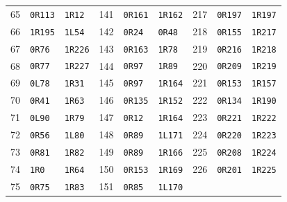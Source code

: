 \begin{longtable}{rll@{\hspace{8mm}}rll@{\hspace{8mm}}rll}
65 & \texttt{0R113} & \texttt{1R12} & 141 & \texttt{0R161} & \texttt{1R162} & 217 & \texttt{0R197} & \texttt{1R197} \\
66 & \texttt{1R195} & \texttt{1L54} & 142 & \texttt{0R24} & \texttt{0R48} & 218 & \texttt{0R155} & \texttt{1R217} \\
67 & \texttt{0R76} & \texttt{1R226} & 143 & \texttt{0R163} & \texttt{1R78} & 219 & \texttt{0R216} & \texttt{1R218} \\
68 & \texttt{0R77} & \texttt{1R227} & 144 & \texttt{0R97} & \texttt{1R89} & 220 & \texttt{0R209} & \texttt{1R219} \\
69 & \texttt{0L78} & \texttt{1R31} & 145 & \texttt{0R97} & \texttt{1R164} & 221 & \texttt{0R153} & \texttt{1R157} \\
70 & \texttt{0R41} & \texttt{1R63} & 146 & \texttt{0R135} & \texttt{1R152} & 222 & \texttt{0R134} & \texttt{1R190} \\
71 & \texttt{0L90} & \texttt{1R79} & 147 & \texttt{0R12} & \texttt{1R164} & 223 & \texttt{0R221} & \texttt{1R222} \\
72 & \texttt{0R56} & \texttt{1L80} & 148 & \texttt{0R89} & \texttt{1L171} & 224 & \texttt{0R220} & \texttt{1R223} \\
73 & \texttt{0R81} & \texttt{1R82} & 149 & \texttt{0R89} & \texttt{1R166} & 225 & \texttt{0R208} & \texttt{1R224} \\
74 & \texttt{1R0} & \texttt{1R64} & 150 & \texttt{0R153} & \texttt{1R169} & 226 & \texttt{0R201} & \texttt{1R225} \\
75 & \texttt{0R75} & \texttt{1R83} & 151 & \texttt{0R85} & \texttt{1L170} &  &  &  \\
\end{longtable}
